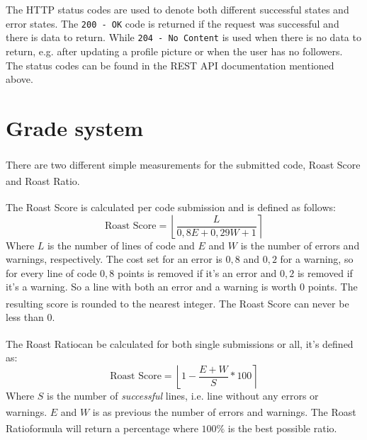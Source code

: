 \documentclass[12pt,a4paper]{report}
\begin{document}
The HTTP status codes are used to denote both different successful states and error states. The \texttt{200 - OK} code is returned if the request was successful and there is data to return. While \texttt{204 - No Content} is used when there is no data to return, e.g. after updating a profile picture or when the user has no followers. The status codes can be found in the REST API documentation mentioned above.

\newcommand{\rratio}{Roast\textsuperscript{\textregistered} Ratio\textsuperscript{\texttrademark}}
\newcommand{\rscore}{Roast\textsuperscript{\textregistered} Score\textsuperscript{\texttrademark}}

\section{Grade system}
There are two different simple measurements for the submitted code, \rscore{}
and \rratio{}.

The \rscore{} is calculated per code submission and is defined as follows:
\begin{equation*}
    \text{Roast Score} = \left\lfloor\frac{L}{0,8E + 0,29W + 1}\right\rceil
\end{equation*}
Where $L$ is the number of lines of code and $E$ and $W$ is the number of errors
and warnings, respectively. The cost set for an error is $0,8$ and $0,2$ for a
warning, so for every line of code $0,8$ points is removed if it's an error and
$0,2$ is removed if it's a warning. So a line with both an error and a warning
is worth $0$ points. The resulting score is rounded to the nearest integer. The
\rscore{} can never be less than $0$.

The \rratio can be calculated for both single submissions or all, it's defined as:
\begin{equation*}
    \text{Roast Score} = \left\lfloor 1 - \frac{E + W}{S} * 100 \right\rceil
\end{equation*}
Where $S$ is the number of \textit{successful} lines, i.e. line without any errors or warnings. $E$ and $W$ is as previous the number of errors and warnings. The \rratio formula will return a percentage where $100 \%$ is the best possible ratio.

\end{document}
